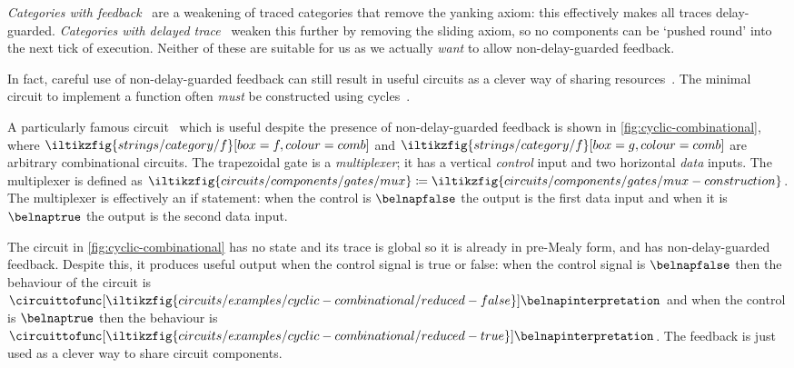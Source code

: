 \documentclass{lmcs}
\begin{document}
\begin{rem}
    \emph{Categories with feedback}~\cite{katis2002feedback} are a weakening of
    traced categories that remove the yanking axiom: this effectively makes all
    traces delay-guarded.
    \emph{Categories with delayed trace}~\cite{sprunger2019differentiable}
    weaken this further by removing the sliding axiom, so no components can be
    `pushed round' into the next tick of execution.
    Neither of these are suitable for us as we actually \emph{want} to allow
    non-delay-guarded feedback.
\end{rem}

In fact, careful use of non-delay-guarded feedback can still result in useful
circuits as a clever way of sharing
resources~\cite{malik1994analysis,riedel2004cyclic,mendler2012constructive}.
The minimal circuit to implement a function often \emph{must} be
constructed using cycles~\cite{rivest1977necessity,riedel2003synthesis}.

\begin{exa}\label{ex:cyclic-combinational}
    A particularly famous circuit~\cite{malik1994analysis} which is useful
    despite the presence of non-delay-guarded feedback is shown in
    \autoref{fig:cyclic-combinational}, where \(
    \iltikzfig{strings/category/f}[box=f,colour=comb]
    \) and \(
    \iltikzfig{strings/category/f}[box=g,colour=comb]
    \) are arbitrary combinational circuits.
    The trapezoidal gate is a \emph{multiplexer}; it has a vertical
    \emph{control} input and two horizontal \emph{data} inputs.
    The multiplexer is defined as \(
    \iltikzfig{circuits/components/gates/mux}
    \coloneqq
    \iltikzfig{circuits/components/gates/mux-construction}
    \).
    The multiplexer is effectively an if statement: when the control is
    \(\belnapfalse\) the output is the first data input and when it is
    \(\belnaptrue\) the output is the second data input.

    The circuit in \autoref{fig:cyclic-combinational} has no state and its trace is
    global so it is already in pre-Mealy form, and has
    non-delay-guarded feedback.
    Despite this, it produces useful output when the control signal is true or
    false:
    when the control signal is \(\belnapfalse\) then the behaviour of the
    circuit is \(
    \circuittofunc[
        \iltikzfig{circuits/examples/cyclic-combinational/reduced-false}
    ]{\belnapinterpretation}
    \) and when the control is \(\belnaptrue\) then the behaviour is \(
    \circuittofunc[
        \iltikzfig{circuits/examples/cyclic-combinational/reduced-true}
    ]{\belnapinterpretation}
    \).
    The feedback is just used as a clever way to share circuit components.
\end{exa}
\end{document}
